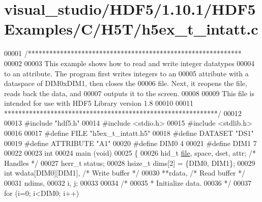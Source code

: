 \hypertarget{visual__studio_2_h_d_f5_21_810_81_2_h_d_f5_examples_2_c_2_h5_t_2h5ex__t__intatt_8c_source}{}\section{visual\+\_\+studio/\+H\+D\+F5/1.10.1/\+H\+D\+F5\+Examples/\+C/\+H5\+T/h5ex\+\_\+t\+\_\+intatt.c}
\label{visual__studio_2_h_d_f5_21_810_81_2_h_d_f5_examples_2_c_2_h5_t_2h5ex__t__intatt_8c_source}

\begin{DoxyCode}
00001 \textcolor{comment}{/************************************************************}
00002 \textcolor{comment}{}
00003 \textcolor{comment}{  This example shows how to read and write integer datatypes}
00004 \textcolor{comment}{  to an attribute.  The program first writes integers to an}
00005 \textcolor{comment}{  attribute with a dataspace of DIM0xDIM1, then closes the}
00006 \textcolor{comment}{  file.  Next, it reopens the file, reads back the data, and}
00007 \textcolor{comment}{  outputs it to the screen.}
00008 \textcolor{comment}{}
00009 \textcolor{comment}{  This file is intended for use with HDF5 Library version 1.8}
00010 \textcolor{comment}{}
00011 \textcolor{comment}{ ************************************************************/}
00012 
00013 \textcolor{preprocessor}{#include "hdf5.h"}
00014 \textcolor{preprocessor}{#include <stdio.h>}
00015 \textcolor{preprocessor}{#include <stdlib.h>}
00016 
00017 \textcolor{preprocessor}{#define FILE            "h5ex\_t\_intatt.h5"}
00018 \textcolor{preprocessor}{#define DATASET         "DS1"}
00019 \textcolor{preprocessor}{#define ATTRIBUTE       "A1"}
00020 \textcolor{preprocessor}{#define DIM0            4}
00021 \textcolor{preprocessor}{#define DIM1            7}
00022 
00023 \textcolor{keywordtype}{int}
00024 main (\textcolor{keywordtype}{void})
00025 \{
00026     hid\_t       \hyperlink{structfile}{file}, space, dset, attr;            \textcolor{comment}{/* Handles */}
00027     herr\_t      status;
00028     hsize\_t     dims[2] = \{DIM0, DIM1\};
00029     \textcolor{keywordtype}{int}         wdata[DIM0][DIM1],                  \textcolor{comment}{/* Write buffer */}
00030                 **rdata,                            \textcolor{comment}{/* Read buffer */}
00031                 ndims,
00032                 i, j;
00033 
00034     \textcolor{comment}{/*}
00035 \textcolor{comment}{     * Initialize data.}
00036 \textcolor{comment}{     */}
00037     \textcolor{keywordflow}{for} (i=0; i<DIM0; i++)

\end{DoxyCode}
